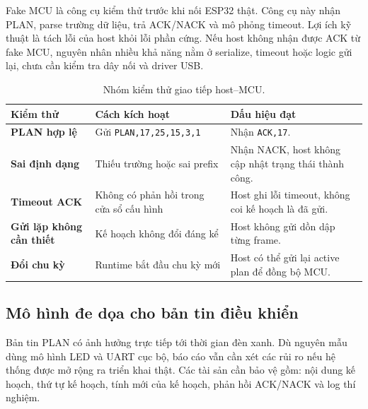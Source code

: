 Fake MCU là công cụ kiểm thử trước khi nối ESP32 thật. Công cụ này nhận PLAN, parse trường dữ liệu, trả ACK/NACK và mô phỏng timeout. Lợi ích kỹ thuật là tách lỗi của host khỏi lỗi phần cứng. Nếu host không nhận được ACK từ fake MCU, nguyên nhân nhiều khả năng nằm ở serialize, timeout hoặc logic gửi lại, chưa cần kiểm tra dây nối và driver USB.

\begin{table}[H]
\centering
\caption{Nhóm kiểm thử giao tiếp host--MCU.}
\label{tab:fake-mcu-tests}
\small
\begin{tabularx}{\linewidth}{>{\bfseries}p{3.0cm}YY}
\toprule
Kiểm thử & Cách kích hoạt & Dấu hiệu đạt \\
\midrule
PLAN hợp lệ & Gửi \texttt{PLAN,17,25,15,3,1} & Nhận \texttt{ACK,17}. \\
Sai định dạng & Thiếu trường hoặc sai prefix & Nhận NACK, host không cập nhật trạng thái thành công. \\
Timeout ACK & Không có phản hồi trong cửa sổ cấu hình & Host ghi lỗi timeout, không coi kế hoạch là đã gửi. \\
Gửi lặp không cần thiết & Kế hoạch không đổi đáng kể & Host không gửi dồn dập từng frame. \\
Đổi chu kỳ & Runtime bắt đầu chu kỳ mới & Host có thể gửi lại active plan để đồng bộ MCU. \\
\bottomrule
\end{tabularx}
\normalsize
\end{table}

\subsection{Mô hình đe dọa cho bản tin điều khiển}

Bản tin PLAN có ảnh hưởng trực tiếp tới thời gian đèn xanh. Dù nguyên mẫu dùng mô hình LED và UART cục bộ, báo cáo vẫn cần xét các rủi ro nếu hệ thống được mở rộng ra triển khai thật. Các tài sản cần bảo vệ gồm: nội dung kế hoạch, thứ tự kế hoạch, tính mới của kế hoạch, phản hồi ACK/NACK và log thí nghiệm.


